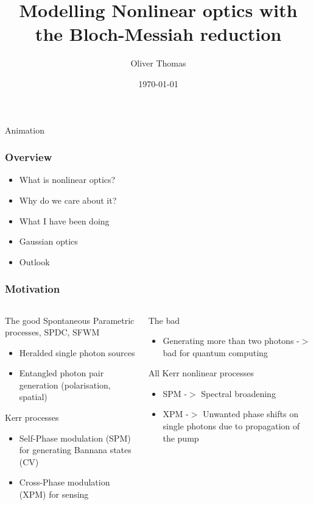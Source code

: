 \documentclass{beamer}
\title{Modelling Nonlinear optics with the Bloch-Messiah reduction}
\author{Oliver Thomas}
\institute{Quantum Engineering CDT \\ University of Bristol}
\date{\today}
\begin{document}
\frame{\titlepage}

\begin{frame}{Animation}

    \begin{figure}
    
    \end{figure}
\end{frame}


\begin{frame}
\frametitle{Overview}
\begin{itemize}
	\item What is nonlinear optics?
    \item Why do we care about it?
    \item What I have been doing
    \item Gaussian optics 
    \item Outlook
\end{itemize}
\end{frame}

\begin{frame}
\frametitle{Motivation}
\begin{columns}
    \begin{block}{The good}
    Spontaneous Parametric processes, SPDC, SFWM
    \begin{itemize}
        \item Heralded single photon sources
        \item Entangled photon pair generation (polarisation, spatial)
    \end{itemize}
    Kerr processes 
    \begin{itemize}
        \item Self-Phase modulation (SPM) for generating Bannana states (CV)
        \item Cross-Phase modulation (XPM) for sensing
    \end{itemize}
    \end{block}
%
    \begin{block}{The bad}
        \begin{itemize}
            \item Generating more than two photons -$>$ bad for quantum computing
        \end{itemize}
        All Kerr nonlinear processes 
        \begin{itemize}
            \item SPM -$>$ Spectral broadening
            \item XPM -$>$ Unwanted phase shifts on single photons due to propagation of the pump 
        \end{itemize}
        \end{block}
\end{columns}

\end{frame}
\end{document}
